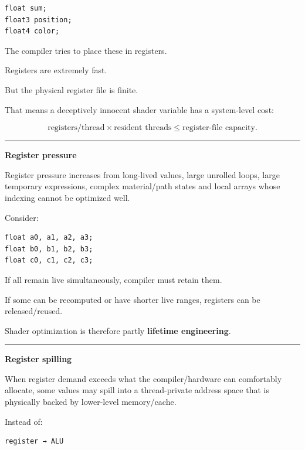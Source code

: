 \protect{}\label{t9jsa8}%
\begin{verbatim}
float sum;
float3 position;
float4 color;
\end{verbatim}

The compiler tries to place these in registers.

Registers are extremely fast.

But the physical register file is finite.

That means a deceptively innocent shader variable has a system-level cost:

\[
\boxed{
\text{registers/thread}
\times
\text{resident threads}
\le
\text{register-file capacity}.
}
\]

\begin{center}\rule{0.5\linewidth}{0.5pt}\end{center}

\textbf{Register pressure}

Register pressure increases from long-lived values, large unrolled loops, large temporary expressions, complex material/path states and local arrays whose indexing cannot be optimized well.

Consider:

\protect{}\label{g2gruk}%
\begin{verbatim}
float a0, a1, a2, a3;
float b0, b1, b2, b3;
float c0, c1, c2, c3;
\end{verbatim}

If all remain live simultaneously, compiler must retain them.

If some can be recomputed or have shorter live ranges, registers can be released/reused.

Shader optimization is therefore partly \textbf{lifetime engineering}.

\begin{center}\rule{0.5\linewidth}{0.5pt}\end{center}

\textbf{Register spilling}

When register demand exceeds what the compiler/hardware can comfortably allocate, some values may spill into a thread-private address space that is physically backed by lower-level memory/cache.

Instead of:

\protect{}\label{i9imdl}%
\begin{verbatim}
register → ALU
\end{verbatim}

